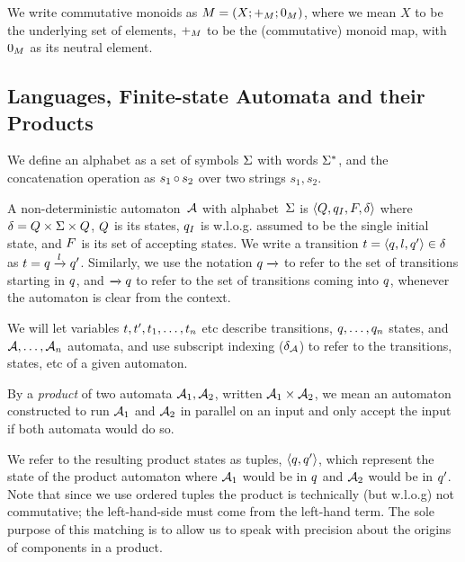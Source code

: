 \documentclass[acmsmall,review,anonymous,screen]{acmart}\settopmatter{printfolios=true,printccs=false,printacmref=true}
\theoremstyle{definition}
\begin{document}
We write commutative monoids as $M =
\left(X;+_{M};0_{M}\right)$, where we mean $X$ to be the underlying
set of elements, $+_{M}$ to be the (commutative) monoid map, with
$0_{M}$ as its neutral element.

\subsection{Languages, Finite-state Automata and their Products}

We define an alphabet as a set of symbols $\Sigma$ with words $\Sigma^*$, and
the concatenation operation as $s_1 \operatorname{\circ}{} s_2$ over two strings $s_1, s_2$.

A non-deterministic automaton~$\mathcal{A}$ with alphabet~$\Sigma$ is
$\left\langle Q, q_I, F, \delta\right\rangle$ where $\delta = Q \times \Sigma \times
Q$, $Q$ is its states, $q_I$ is w.l.o.g. assumed to be the
single initial state, and $F$ is its set of accepting states.  We
write a transition $t = \left\langle q, l, q'\right\rangle \in
\delta$ as $t = q \xrightarrow{l} q'$.
Similarly, we use the notation $q \xrightarrow{}$ to refer to the set of
transitions starting in $q$, and $\xrightarrow{} q$ to refer to the
set of transitions coming into $q$, whenever the automaton is clear from
the context.

We will let variables $t, t', t_1, \ldots,
t_n$ etc describe transitions, $q, \ldots, q_n$ states, and
$\mathcal{A}, \ldots, \mathcal{A}_n$ automata, and use subscript indexing
($\delta_{\mathcal{A}}$) to refer to the transitions, states, etc of a given
automaton.

By a \emph{product} of two automata $\mathcal{A}_1, \mathcal{A}_2$, written
$\mathcal{A}_1 \times \mathcal{A}_2$, we mean an automaton constructed to run
$\mathcal{A}_1$ and $\mathcal{A}_2$ in parallel on an input and only accept the
input if both automata would do so.

We refer to the resulting product states as tuples, $\left\langle q, q'\right\rangle$,
which represent the state of the product automaton where $\mathcal{A}_1$ would be
in $q$ and $\mathcal{A}_2$ would be in $q'$. Note that since we use
ordered tuples the product is technically (but w.l.o.g) not commutative; the
left-hand-side must come from the left-hand term. The sole purpose of this
matching is to allow us to speak with precision about the origins of components
in a product.
\end{document}
